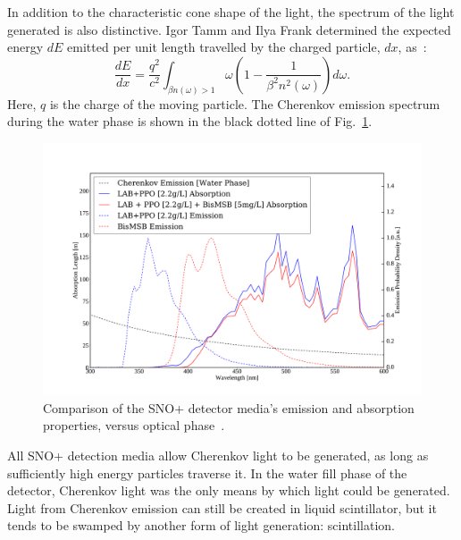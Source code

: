In addition to the characteristic cone shape of the light, the spectrum of the light generated is also distinctive. Igor Tamm and Ilya Frank determined the expected energy $dE$ emitted per unit length travelled by the charged particle, $dx$, as~\cite{frankCoherentVisibleRadiation1937}: %
\begin{equation}
    \frac{dE}{dx} = 
    \frac{q^2}{c^{2}}\int_{\beta n(\omega)>1}\omega\left(1-\frac{1}{\beta^{2}n^{2}(\omega)}\right)d\omega.
\end{equation}
Here, $q$ is the charge of the moving particle. The Cherenkov emission spectrum during the water phase is shown in the black dotted line of Fig.~\ref{fig:cherenkov_scintillator_abs_emit_dist}.

\begin{figure}
    \centering
    \includegraphics[width=0.8\linewidth]{2_Detector/Figs/scint_lengths_LABPPOBisMSB_plot_nice.pdf}
    \caption[Comparison of the SNO+ detector media's emission properties, versus optical phase]
    {Comparison of the SNO+ detector media's emission and absorption properties, versus optical phase~\cite{kaptanogluOpticsOverviewProposed2016,kaptanogluDocumentationAttenuationStudies2022}. %
    }
    \label{fig:cherenkov_scintillator_abs_emit_dist}
\end{figure}

All SNO+ detection media allow Cherenkov light to be generated, as long as sufficiently high energy particles traverse it. In the water fill phase of the detector, Cherenkov light was the only means by which light could be generated. Light from Cherenkov emission can still be created in liquid scintillator, but it tends to be swamped by another form of light generation: scintillation.
